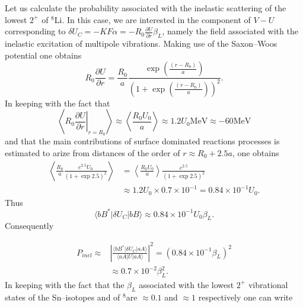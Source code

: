\documentclass[a4paper,14pt]{article}
\begin{document}
Let us calculate the probability associated with the inelastic scattering of the lowest $2^+$ of $^8$Li. In this case, we are interested in the component of $V-U$ corresponding to $\delta U_C= -KF\alpha=-R_0\frac{\partial U}{\partial r}\beta_L$, namely the field associated with the inelastic excitation of multipole vibrations. Making use of the Saxon--Woos potential one obtains
\begin{equation}\label{eq_est_27}
R_0\frac{\partial U}{\partial r}=\frac{R_0}{a}\frac{\exp\left(\frac{(r-R_0)}{a}\right)}{\left(1+\exp\left(\frac{(r-R_0)}{a}\right)\right)^2}.
\end{equation}
In keeping with the fact that
\begin{equation}\label{eq_est_28}
\left\langle R_0 \left.\frac{\partial U}{\partial r}\right|_{r=R_0}\right\rangle \approx \left\langle \frac{R_0 U_0}{a}\right\rangle \approx 1.2 U_0 \text{MeV} \approx -60 \text{MeV}
\end{equation}
and that the main contributions of surface dominated reactions processes is estimated to arize from distances of the order of $r\approx R_0 + 2.5 a$, one obtains
\begin{equation}\label{eq_est_29}
\begin{split}
\left\langle \frac{R_0}{a}\frac{e^{2.5}U_0}{\left(1+\exp 2.5\right)^2}\right\rangle &= \left\langle \frac{R_0 U_0}{a}\right\rangle\frac{e^{2.5}}{\left(1+\exp 2.5\right)^2}\\
&\approx1.2U_0\times 0.7 \times 10^{-1}=0.84\times 10^{-1}U_0.
\end{split}
\end{equation}
Thus
\begin{equation}\label{eq_est_30}
\langle bB^*|\delta U_C|bB\rangle \approx 0.84\times 10^{-1}U_0 \beta_L.
\end{equation}
Consequently

\begin{equation}\label{eq_est_31}
\begin{split}
P_{inel} \approx &\left|\frac{\langle bB^*|\delta U_C|aA\rangle}{\langle aA|U|aA\rangle}\right|^2=\left(0.84\times 10^{-1} \beta_L\right)^2\\
&\approx 0.7\times 10^{-2}\beta_L^2.
\end{split}
\end{equation}
In keeping with the fact that the $\beta_L$ associated with the lowest $2^+$ vibrational states of the Sn--isotopes and of $^8$are $\approx 0.1$ and $\approx 1$ respectively one can write
\end{document}
